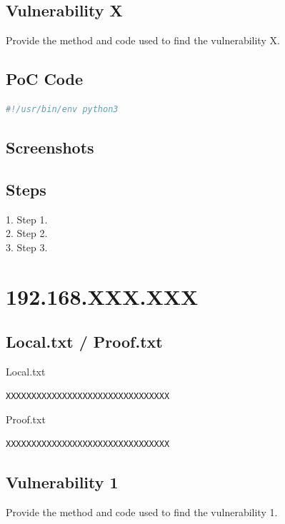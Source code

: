 \documentclass[a4paper]{article}
\begin{document}
\subsection{Vulnerability X}
Provide the method and code used to find the vulnerability X.

\subsection{PoC Code}

\begin{lstlisting}[language=Python]
#!/usr/bin/env python3

\end{lstlisting}


\subsection{Screenshots}



\subsection{Steps}
1. Step 1.\\
2. Step 2.\\
3. Step 3.


\clearpage
\section{192.168.XXX.XXX}

\subsection{Local.txt / Proof.txt }
Local.txt
\begin{lstlisting}[language=Java]
XXXXXXXXXXXXXXXXXXXXXXXXXXXXXXXX
\end{lstlisting}

Proof.txt
\begin{lstlisting}[language=Java]
XXXXXXXXXXXXXXXXXXXXXXXXXXXXXXXX
\end{lstlisting}
\subsection{Vulnerability 1}
Provide the method and code used to find the vulnerability 1.
\end{document}
